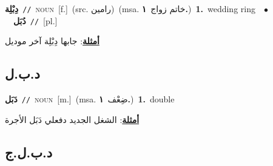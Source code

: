 \documentclass[10pt,a4paper,twoside]{article} %
\begin{document}
\begin{multicols}{2}
{\setlength\topsep{0pt}\textbf{\foreignlanguage{arabic}{دِبْلِة}}\ {\color{gray}\texttt{//}\color{black}}\ \textsc{noun}\ [f.]\ (src. \color{gray}\foreignlanguage{arabic}{رامين}\color{black})\ \color{gray}(msa. \foreignlanguage{arabic}{خاتم زواج}~\foreignlanguage{arabic}{\textbf{١.}})\color{black}\ \textbf{1.}~wedding ring\ \ $\bullet$\ \ \setlength\topsep{0pt}\textbf{\foreignlanguage{arabic}{دُبَل}}\ {\color{gray}\texttt{//}\color{black}}\ [pl.]\  \begin{flushright}\color{gray}\foreignlanguage{arabic}{\textbf{\underline{\foreignlanguage{arabic}{أمثلة}}}: جابها دِبْلِة آخر موديل}\end{flushright}\color{black}} \vspace{2mm}

\vspace{-3mm}
\subsection*{\color{blue}\foreignlanguage{arabic}{د.ب.ل}\color{blue}{ (ntws)}} 

{\setlength\topsep{0pt}\textbf{\foreignlanguage{arabic}{دَبَل}}\ {\color{gray}\texttt{//}\color{black}}\ \textsc{noun}\ [m.]\ \color{gray}(msa. \foreignlanguage{arabic}{ضِعْف}~\foreignlanguage{arabic}{\textbf{١.}})\color{black}\ \textbf{1.}~double\  \begin{flushright}\color{gray}\foreignlanguage{arabic}{\textbf{\underline{\foreignlanguage{arabic}{أمثلة}}}: الشغل الجديد دفعلي دَبَل الأجرة}\end{flushright}\color{black}} \vspace{2mm}

\vspace{-3mm}
\subsection*{\color{blue}\foreignlanguage{arabic}{د.ب.ل.ج}\color{blue}{ (ntws)}} 


\end{multicols}
\end{document}
